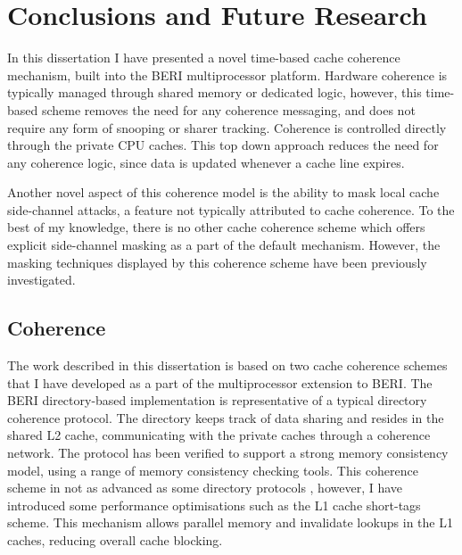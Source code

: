 \makeatletter
\makeatother
\ifpdf
\graphicspath{{Conclusion/ConclusionFigs/PNG/}{Conclusion/ConclusionFigs/PDF/}{Conclusion/ConclusionFigs/}}
\else
\graphicspath{{Conclusion/ConclusionFigs/EPS/}{Conclusion/ConclusionFigs/}}
\fi

\chapter{Conclusions and Future Research}
	In this dissertation I have presented a novel time-based cache coherence mechanism, built into the BERI multiprocessor platform.
	Hardware coherence is typically managed through shared memory or dedicated logic, however, this time-based scheme removes the need for any coherence messaging, and does not require any form of snooping or sharer tracking. Coherence is controlled directly through the private CPU caches. This top down approach reduces the need for any coherence logic, since data is updated whenever a cache line expires.
	
	Another novel aspect of this coherence model is the ability to mask local cache side-channel attacks, a feature not typically attributed to cache coherence. To the best of my knowledge, there is no other cache coherence scheme which offers explicit side-channel masking as a part of the default mechanism. However, the masking techniques displayed by this coherence scheme have been previously investigated.

	\section{Coherence}
		The work described in this dissertation is based on two cache coherence schemes that I have developed as a part of the multiprocessor extension to BERI. The BERI directory-based implementation is representative of a typical directory coherence protocol. The directory keeps track of data sharing and resides in the shared L2 cache, communicating with the private caches through a coherence network. The  protocol has been verified to support a strong memory consistency model, using a range of memory consistency checking tools. This coherence scheme in not as advanced as some directory protocols \cite{Sanchez12,Cuesta11,Cuesta13}, however, I have introduced some performance optimisations such as the L1 cache short-tags scheme. This mechanism allows parallel memory and invalidate lookups in the L1 caches, reducing overall cache blocking.
		
